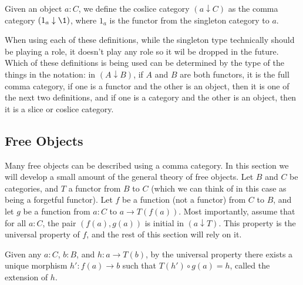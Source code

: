 \documentclass[../../math.tex]{subfiles}
\begin{document}
\begin{definition}
    Given an object $a : C$, we define the coslice category $(a \downarrow C)$
    as the comma category $(1_a \downarrow \1)$, where $1_a$ is the functor from
    the singleton category to $a$.
\end{definition}

When using each of these definitions, while the singleton type technically
should be playing a role, it doesn't play any role so it wil be dropped in the
future.  Which of these definitions is being used can be determined by the type
of the things in the notation: in $(A \downarrow B)$, if $A$ and $B$ are both
functors, it is the full comma category, if one is a functor and the other is an
object, then it is one of the next two definitions, and if one is a category and
the other is an object, then it is a slice or coslice category.

\subsection{Free Objects} \label{cat_comma_free}

Many free objects can be described using a comma category.  In this section we
will develop a small amount of the general theory of free objects.  Let $B$ and
$C$ be categories, and $T$ a functor from $B$ to $C$ (which we can think of in
this case as being a forgetful functor).  Let $f$ be a function (not a functor)
from $C$ to $B$, and let $g$ be a function from $a : C$ to $a \to T(f(a))$.
Most importantly, assume that for all $a : C$, the pair $(f(a), g(a))$ is
initial in $(a \downarrow T)$.  This property is the universal property of $f$,
and the rest of this section will rely on it.

\begin{definition}
    Given any $a : C$, $b : B$, and $h : a \to T(b)$, by the universal property
    there exists a unique morphism $h' : f(a) \to b$ such that $T(h') \circ g(a)
    = h$, called the extension of $h$.
\end{definition}
\end{document}
